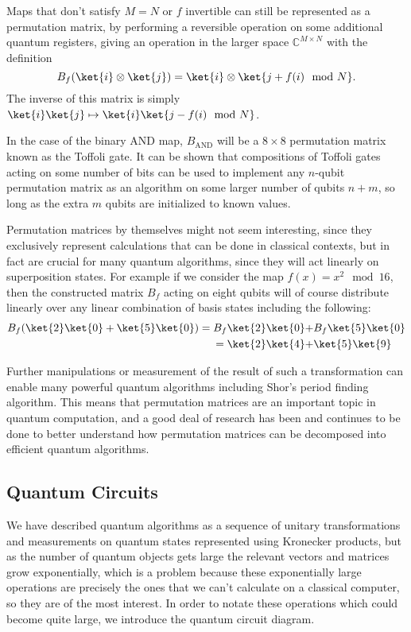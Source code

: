 Maps that don't satisfy $M = N$ or $f$ invertible can still be represented as a permutation matrix, by performing a reversible operation on some additional quantum registers, giving an operation in the larger space $\mathbb{C}^{M\times N}$ with the definition
\[B_f(\ket{i}\otimes\ket{j}) = \ket{i}\otimes\ket{j+f(i) \mod N}.\]
The inverse of this matrix is simply $\ket{i}\ket{j} \mapsto \ket{i}\ket{j-f(i) \mod N}$.

In the case of the binary AND map, $B_{\text{AND}}$ will be a $8\times8$ permutation matrix known as the Toffoli gate. It can be shown that compositions of Toffoli gates acting on some number of bits can be used to implement any $n$-qubit permutation matrix as an algorithm on some larger number of qubits $n+m$, so long as the extra $m$ qubits are initialized to known values.

Permutation matrices by themselves might not seem interesting, since they exclusively represent calculations that can be done in classical contexts, but in fact are crucial for many quantum algorithms, since they will act linearly on superposition states. For example if we consider the map $f(x) = x^2\mod 16$, then the constructed matrix $B_f$ acting on eight qubits will of course distribute linearly over any linear combination of basis states including the following:
\begin{align*}
	B_f(\ket{2}\ket{0}+\ket{5}\ket{0}) 
	= B_f\ket{2}\ket{0} +& B_f\ket{5}\ket{0}
	\\= \ket{2}\ket{4} +& \ket{5}\ket{9}
\end{align*}

Further manipulations or measurement of the result of such a transformation can enable many powerful quantum algorithms including Shor's period finding algorithm. This means that permutation matrices are an important topic in quantum computation, and a good deal of research has been and continues to be done to better understand how permutation matrices can be decomposed into efficient quantum algorithms.

\subsection{Quantum Circuits}
We have described quantum algorithms as a sequence of unitary transformations and measurements on quantum states represented using Kronecker products, but as the number of quantum objects gets large the relevant vectors and matrices grow exponentially, which is a problem because these exponentially large operations are precisely the ones that we can't calculate on a classical computer, so they are of the most interest. In order to notate these operations which could become quite large, we introduce the quantum circuit diagram.

